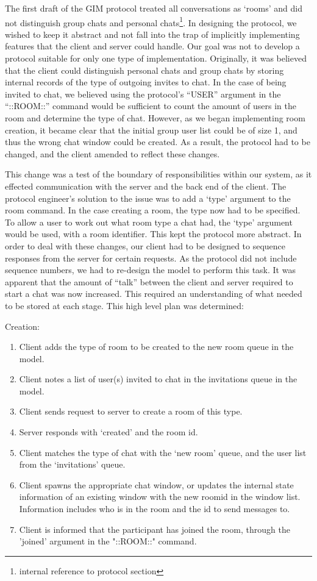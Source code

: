 The first draft of the GIM protocol treated all conversations as `rooms' and did not distinguish group chats and personal chats\footnote{internal reference to protocol section}. In designing the protocol, we wished to keep it abstract and not fall into the trap of implicitly implementing features that the client and server could handle. Our goal was not to develop a protocol suitable for only one type of implementation. Originally, it was believed that the client could distinguish personal chats and group chats by storing internal records of the type of outgoing invites to chat. In the case of being invited to chat, we believed using the protocol's ``USER'' argument in the ``::ROOM::'' command would be sufficient to count the amount of users in the room and determine the type of chat. However, as we began implementing room creation, it became clear that the initial group user list could be of size 1, and thus the wrong chat window could be created. As a result, the protocol had to be changed, and the client amended to reflect these changes. 

This change was a test of the boundary of responsibilities within our system, as it effected communication with the server and the back end of the client. The protocol engineer's solution to the issue was to add a `type' argument to the room command. In the case creating a room, the type now had to be specified. To allow a user to work out what room type a chat had, the `type' argument would be used, with a room identifier. This kept the protocol more abstract. In order to deal with these changes, our client had to be designed to sequence responses from the server for certain requests. As the protocol did not include sequence numbers, we had to re-design the model to perform this task. It was apparent that the amount of ``talk'' between the client and server required to start a chat was now increased. This required an understanding of what needed to be stored at each stage. This high level plan was determined:

Creation:
\begin{enumerate}
\item Client adds the type of room to be created to the new room queue in the model.
\item Client notes a list of user(s) invited to chat in the invitations queue in the model.
\item Client sends request to server to create a room of this type.
\item Server responds with `created' and the room id.
\item Client matches the type of chat with the `new room' queue, and the user list from the `invitations' queue.
\item Client spawns the appropriate chat window, or updates the internal state information of an existing window with the new roomid in the window list. Information includes who is in the room and the id to send messages to.
\item Client is informed that the participant has joined the room, through the 'joined' argument in the "::ROOM::" command.
\end {enumerate}

